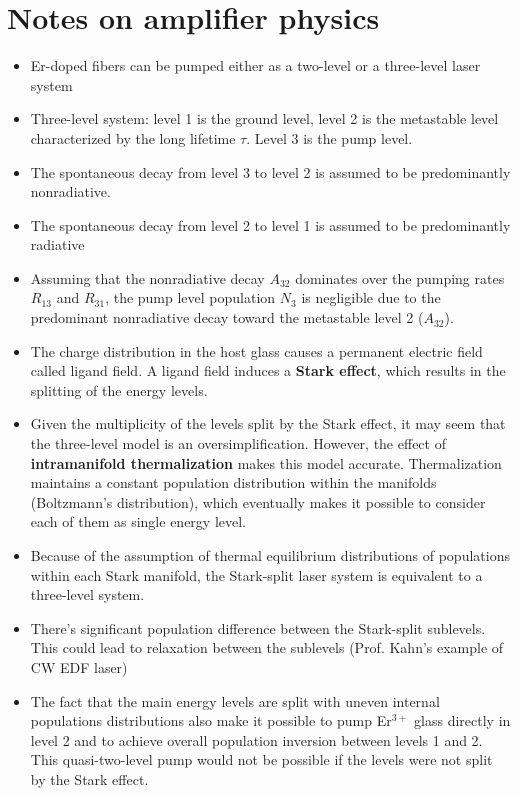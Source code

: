 \documentclass[a4paper]{article}
\begin{document}
\newpage
\section{Notes on amplifier physics}

\begin{itemize}
	\item Er-doped fibers can be pumped either as a two-level or a three-level  laser system
	\item Three-level system: level 1 is the ground level, level 2 is the metastable level characterized by the long lifetime $\tau$. Level 3 is the pump level.
	\item The spontaneous decay from level 3 to level 2 is assumed to be predominantly nonradiative.
	\item The spontaneous decay from level 2 to level 1 is assumed to be predominantly radiative
	\item Assuming that the nonradiative decay $A_{32}$ dominates over the pumping rates $R_{13}$ and $R_{31}$, the pump level population $N_3$ is negligible due to the predominant nonradiative decay toward the metastable level 2 ($A_{32}$).
	\item The charge distribution in the host glass causes a permanent electric field called ligand field. A ligand field induces a \textbf{Stark effect}, which results in the splitting of the energy levels.
	\item Given the multiplicity of the levels split by the Stark effect, it may seem that the three-level model is an oversimplification. However, the effect of \textbf{intramanifold thermalization} makes this model accurate. Thermalization maintains a constant population distribution within the manifolds (Boltzmann's distribution), which eventually makes it possible to consider each of them as single
	energy level.
	\item Because of the assumption of thermal equilibrium distributions of populations within each Stark manifold, the Stark-split laser system is equivalent to a three-level system.
	\item There's significant population difference between the Stark-split sublevels. This could lead to relaxation between the sublevels (Prof. Kahn's example of CW EDF laser)
	\item The fact that the main energy levels are split with uneven internal populations distributions also make it possible to pump Er$^{3+}$ glass directly in level 2 and to achieve overall population inversion between levels 1 and 2. This quasi-two-level pump would not be possible if the levels were not split by the Stark effect.

\end{itemize}
\end{document}
